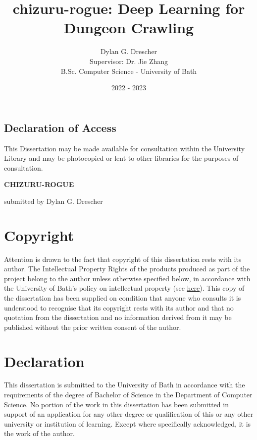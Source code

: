 \documentclass[12pt,a4paper]{article}
\begin{document}
    \title{chizuru-rogue: Deep Learning for Dungeon Crawling}
    \author{Dylan G. Drescher\\[1ex]Supervisor: Dr. Jie Zhang\\[1ex]B.Sc. Computer Science - University of Bath}
    \date{2022 - 2023}
    \maketitle

    \setcounter{page}{0}
    \thispagestyle{empty}

    \newpage

    \begin{center}
        \section*{Declaration of Access}

        This Dissertation may be made available for consultation within the University Library and may be photocopied or lent to other libraries for the purposes of consultation.
    \end{center}

    \newpage

    \textbf{CHIZURU-ROGUE}

    submitted by Dylan G. Drescher

    \section*{Copyright}
    Attention is drawn to the fact that copyright of this dissertation rests with its author.
    The Intellectual Property Rights of the products produced as part of the project belong to the author unless otherwise specified below, in accordance with the University of Bath's policy on intellectual property (see \href{https://www.bath.ac.uk/publications/university-ordinances/attachments/Ordinances_1_October_2020.pdf}{here}).
    This copy of the dissertation has been supplied on condition that anyone who consults it is understood to recognise that its copyright rests with its author and that no quotation from the dissertation and no information derived from it may be published without the prior written consent of the author.

    \section*{Declaration}
    This dissertation is submitted to the University of Bath in accordance with the requirements of the degree of Bachelor of Science in the Department of Computer Science.
    No portion of the work in this dissertation has been submitted in support of an application for any other degree or qualification of this or any other university or institution of learning.
    Except where specifically acknowledged, it is the work of the author.
\end{document}
